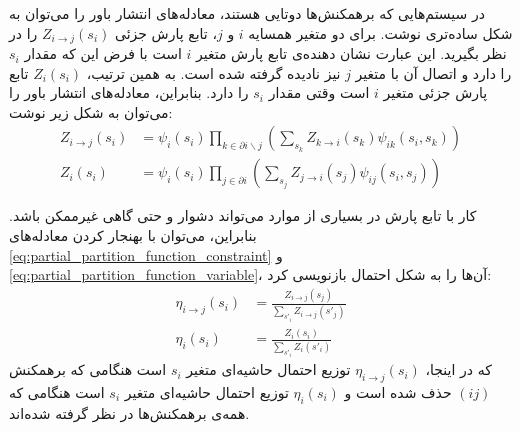 \begin{appendices}
    در سیستم‌هایی که برهمکنش‌ها دوتایی هستند، معادله‌های انتشار باور را می‌توان به شکل ساده‌تری نوشت.
    برای دو متغیر همسایه
    \( i \) و \( j \)،
    تابع پارش جزئی
    \( Z_{i \to j}(s_i) \)
    را در نظر بگیرید.
    این عبارت نشان دهنده‌ی تابع پارش متغیر
    \( i \)
    است با فرض این که مقدار
    \( s_{i} \)
    را دارد و اتصال آن با متغیر
    \( j \)
    نیز نادیده گرفته شده است.
    به همین ترتیب،
    \( Z_{i}(s_{i}) \)
    تابع پارش جزئی متغیر
    \( i \)
    است وقتی مقدار
    \( s_{i} \)
    را دارد.
    بنابراین، معادله‌های انتشار باور را می‌توان به شکل زیر نوشت:
    \begin{align}
        \label{eq:partial_partition_function_constraint}
        Z_{i \to j}(s_{i}) & = \psi_{i}(s_{i}) \prod_{k \in \partial i \backslash j} \left( \sum_{s_{k}} Z_{k \to i}(s_{k}) \psi_{ik}(s_{i},s_{k}) \right) \\
        \label{eq:partial_partition_function_variable}
        Z_{i}(s_{i})       & = \psi_{i}(s_{i}) \prod_{j \in \partial i} \left( \sum_{s_{j}} Z_{j \to i}(s_{j}) \psi_{ij}(s_{i},s_{j}) \right)
    \end{align}

    کار با تابع پارش در بسیاری از موارد می‌تواند دشوار و حتی گاهی غیرممکن باشد.
    بنابراین، می‌توان با بهنجار کردن معادله‌های
    \ref{eq:partial_partition_function_constraint} و \ref{eq:partial_partition_function_variable}،
    آن‌ها را به شکل احتمال بازنویسی کرد:
    \begin{align}
        \label{eq:marginal_constraint}
        \eta_{i \to j}(s_{i}) & = \frac{Z_{i \to j}(s_{j})}{\sum_{s'_{i}} Z_{i \to j}(s'_{j})} \\
        \label{eq:marginal_variable}
        \eta_{i}(s_{i})       & = \frac{Z_{i}(s_{i})}{\sum_{s'_{i}} Z_{i}(s'_{i})}
    \end{align}
    که در اینجا،
    \( \eta_{i \to j}(s_{i}) \)
    توزیع احتمال حاشیه‌ای متغیر
    \( s_{i} \)
    است هنگامی که برهمکنش
    \( (ij) \)
    حذف شده است و
    \( \eta_{i}(s_{i}) \)
    توزیع احتمال حاشیه‌ای متغیر
    \( s_{i} \)
    است هنگامی که همه‌ی برهمکنش‌ها در نظر گرفته شده‌اند.


\end{appendices}
